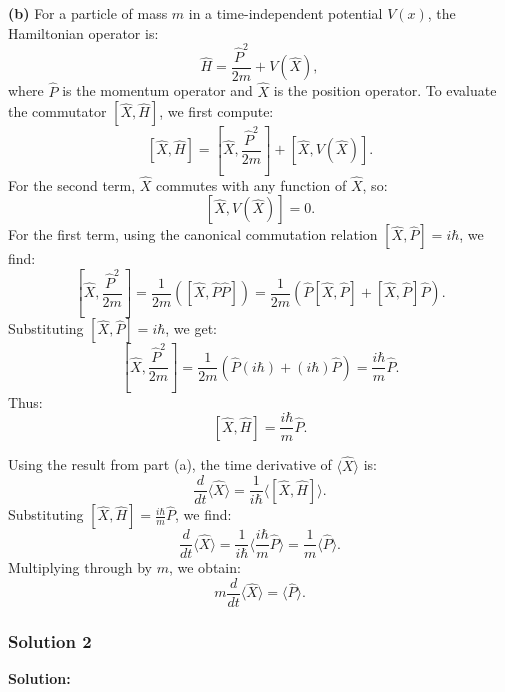 \documentclass{article}
\begin{document}
\textbf{(b)} For a particle of mass $m$ in a time-independent potential $V(x)$, the Hamiltonian operator is:
\[
\hat{H} = \frac{\hat{P}^2}{2m} + V(\hat{X}),
\]
where $\hat{P}$ is the momentum operator and $\hat{X}$ is the position operator. To evaluate the commutator $[\hat{X}, \hat{H}]$, we first compute:
\[
[\hat{X}, \hat{H}] = \left[\hat{X}, \frac{\hat{P}^2}{2m}\right] + \left[\hat{X}, V(\hat{X})\right].
\]
For the second term, $\hat{X}$ commutes with any function of $\hat{X}$, so:
\[
\left[\hat{X}, V(\hat{X})\right] = 0.
\]
For the first term, using the canonical commutation relation $[\hat{X}, \hat{P}] = i\hbar$, we find:
\[
\left[\hat{X}, \frac{\hat{P}^2}{2m}\right] = \frac{1}{2m} \left( [\hat{X}, \hat{P} \hat{P}] \right) = \frac{1}{2m} \left( \hat{P} [\hat{X}, \hat{P}] + [\hat{X}, \hat{P}] \hat{P} \right).
\]
Substituting $[\hat{X}, \hat{P}] = i\hbar$, we get:
\[
\left[\hat{X}, \frac{\hat{P}^2}{2m}\right] = \frac{1}{2m} \left( \hat{P} (i\hbar) + (i\hbar) \hat{P} \right) = \frac{i\hbar}{m} \hat{P}.
\]
Thus:
\[
[\hat{X}, \hat{H}] = \frac{i\hbar}{m} \hat{P}.
\]

Using the result from part (a), the time derivative of $\langle \hat{X} \rangle$ is:
\[
\frac{d}{dt} \langle \hat{X} \rangle = \frac{1}{i\hbar} \langle [\hat{X}, \hat{H}] \rangle.
\]
Substituting $[\hat{X}, \hat{H}] = \frac{i\hbar}{m} \hat{P}$, we find:
\[
\frac{d}{dt} \langle \hat{X} \rangle = \frac{1}{i\hbar} \langle \frac{i\hbar}{m} \hat{P} \rangle = \frac{1}{m} \langle \hat{P} \rangle.
\]
Multiplying through by $m$, we obtain:
\[
m \frac{d}{dt} \langle \hat{X} \rangle = \langle \hat{P} \rangle.
\]



\subsubsection{Solution 2}
\textbf{Solution:}
\end{document}
